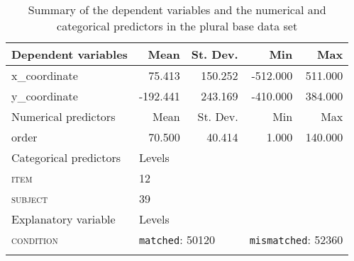 \begin{table}[H]\fontsize{10}{11}
\caption{Summary of the dependent variables and the numerical and categorical predictors in the plural base data set}
\label{tab:7.10}
\centering
\begin{tabular}{lrrrr} 
\lsptoprule
Dependent variables    & Mean     & St. Dev.                  & Min      & Max                           \\ 
\midrule
x\_coordinate          & 75.413   & 150.252                   & -512.000 & 511.000                       \\
y\_coordinate          & -192.441 & 243.169                   & -410.000 & 384.000                       \\ 
\midrule
Numerical predictors   & Mean     & St. Dev.                  & Min      & Max                           \\ 
\midrule
order                  & 70.500   & 40.414                    & 1.000    & 140.000                       \\ 
\midrule
Categorical predictors & \multicolumn{1}{l}{Levels}   & ~                         & ~        & ~                             \\ 
\midrule
\textsc{item}                   & \multicolumn{1}{l}{12}       & ~                         & ~        & ~                             \\
\textsc{subject}                & \multicolumn{1}{l}{39}       & ~                         & ~        & ~                             \\ 
\midrule
Explanatory variable   & \multicolumn{1}{l}{Levels}   & ~                         & ~        & ~                             \\ 
\midrule
\textsc{condition}              & \multicolumn{2}{l}{\texttt{matched}:
  50120} & \multicolumn{2}{l}{\texttt{mismatched}:
  52360}  \\
\lspbottomrule
\end{tabular}
\end{table}






